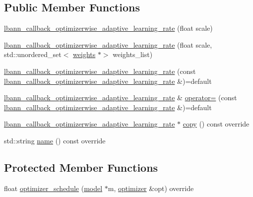 \subsection*{Public Member Functions}
\begin{DoxyCompactItemize}
\item 
\hyperlink{classlbann_1_1lbann__callback__optimizerwise__adaptive__learning__rate_a4ab8768ad85fe17728d62eceb628cc9f}{lbann\+\_\+callback\+\_\+optimizerwise\+\_\+adaptive\+\_\+learning\+\_\+rate} (float scale)
\item 
\hyperlink{classlbann_1_1lbann__callback__optimizerwise__adaptive__learning__rate_a0084b1d49e37d5884f5e93455d9aa4b6}{lbann\+\_\+callback\+\_\+optimizerwise\+\_\+adaptive\+\_\+learning\+\_\+rate} (float scale, std\+::unordered\+\_\+set$<$ \hyperlink{classlbann_1_1weights}{weights} $\ast$$>$ weights\+\_\+list)
\item 
\hyperlink{classlbann_1_1lbann__callback__optimizerwise__adaptive__learning__rate_acf561f3ca522caa6f9d8e8333e5138cc}{lbann\+\_\+callback\+\_\+optimizerwise\+\_\+adaptive\+\_\+learning\+\_\+rate} (const \hyperlink{classlbann_1_1lbann__callback__optimizerwise__adaptive__learning__rate}{lbann\+\_\+callback\+\_\+optimizerwise\+\_\+adaptive\+\_\+learning\+\_\+rate} \&)=default
\item 
\hyperlink{classlbann_1_1lbann__callback__optimizerwise__adaptive__learning__rate}{lbann\+\_\+callback\+\_\+optimizerwise\+\_\+adaptive\+\_\+learning\+\_\+rate} \& \hyperlink{classlbann_1_1lbann__callback__optimizerwise__adaptive__learning__rate_a246fc2136f4210eb2c03b407a746adb8}{operator=} (const \hyperlink{classlbann_1_1lbann__callback__optimizerwise__adaptive__learning__rate}{lbann\+\_\+callback\+\_\+optimizerwise\+\_\+adaptive\+\_\+learning\+\_\+rate} \&)=default
\item 
\hyperlink{classlbann_1_1lbann__callback__optimizerwise__adaptive__learning__rate}{lbann\+\_\+callback\+\_\+optimizerwise\+\_\+adaptive\+\_\+learning\+\_\+rate} $\ast$ \hyperlink{classlbann_1_1lbann__callback__optimizerwise__adaptive__learning__rate_aa28bce451c8f1fa3b273218be976b923}{copy} () const override
\item 
std\+::string \hyperlink{classlbann_1_1lbann__callback__optimizerwise__adaptive__learning__rate_a31120725bd22d1ce783a6edba9c5fb5d}{name} () const override
\end{DoxyCompactItemize}
\subsection*{Protected Member Functions}
\begin{DoxyCompactItemize}
\item 
float \hyperlink{classlbann_1_1lbann__callback__optimizerwise__adaptive__learning__rate_aa9ce00b0ad1fefb20a1108d1120e82d5}{optimizer\+\_\+schedule} (\hyperlink{classlbann_1_1model}{model} $\ast$m, \hyperlink{classlbann_1_1optimizer}{optimizer} \&opt) override
\end{DoxyCompactItemize}

